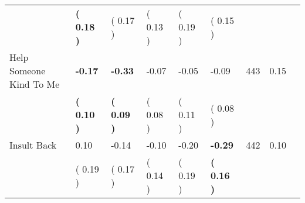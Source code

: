 \begin{tabular}{L{6.2cm} C{1.8cm} C{1.8cm} C{1.8cm} C{1.8cm} C{1.8cm} C{1.8cm} C{0.3cm} C{0.3cm}}
 & \textbf{(     0.18 )} & (     0.17 ) & (     0.13 ) & (     0.19 ) & (     0.15 )  & \\
Help Someone Kind To Me & \textbf{    -0.17} & \textbf{    -0.33} &     -0.07 &     -0.05 &     -0.09  & 443 &       0.15 \\ 
 & \textbf{(     0.10 )} & \textbf{(     0.09 )} & (     0.08 ) & (     0.11 ) & (     0.08 )  & \\
Insult Back &      0.10 &     -0.14 &     -0.10 &     -0.20 & \textbf{    -0.29}  & 442 &       0.10 \\ 
 & (     0.19 ) & (     0.17 ) & (     0.14 ) & (     0.19 ) & \textbf{(     0.16 )}  & \\
\bottomrule
\end{tabular}
